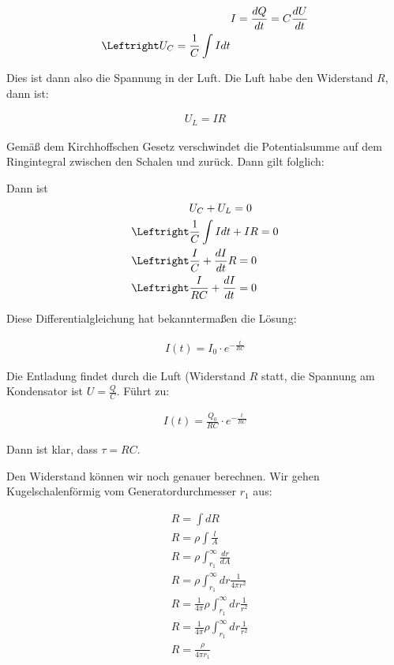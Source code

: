 \documentclass[a4paper,german,12pt,smallheadings]{scrartcl}
\begin{document}
\begin{align*}
  &I = \frac{dQ}{dt} = C \frac{dU}{dt} \\
  \Leftright U_C = \frac{1}{C} \int I dt
\end{align*}

Dies ist dann also die Spannung in der Luft. Die Luft habe den Widerstand $R$, dann ist:

\begin{align*}
  U_L = IR
\end{align*}

Gemäß dem Kirchhoffschen Gesetz verschwindet die Potentialsumme auf dem
Ringintegral zwischen den Schalen und zurück. Dann gilt folglich:

Dann ist
\begin{align*}
  &U_C + U_L = 0 \\
  \Leftright &\frac{1}{C} \int I dt + IR = 0 \\
  \Leftright &\frac{I}{C} + \frac{dI}{dt} R = 0 \\
  \Leftright &\frac{I}{RC} + \frac{dI}{dt} = 0 \\
\end{align*}

Diese Differentialgleichung hat bekanntermaßen die Lösung:

\begin{align*}
  I(t) = I_0 \cdot e^{-\frac{t}{RC}}
\end{align*}

Die Entladung findet durch die Luft (Widerstand $R$ statt, die Spannung am
Kondensator ist $U = \frac{Q}{C}$. Führt zu:

\begin{align*}
  I(t) = \frac{Q_0}{RC} \cdot e^{-\frac{t}{RC}}
\end{align*}

Dann ist klar, dass $\tau = RC$.

Den Widerstand können wir noch genauer berechnen. Wir gehen Kugelschalenförmig vom Generatordurchmesser $r_1$ aus:

\begin{align*}
  &R = \int dR \\
  &R = \rho \int \frac{l}{A} \\
  &R = \rho \int_{r_1}^\infty \frac{dr}{dA} \\
  &R = \rho \int_{r_1}^\infty dr \frac{1}{4 \pi r^2} \\
  &R = \frac{1}{4 \pi}\rho \int_{r_1}^\infty dr \frac{1}{r^2} \\
  &R = \frac{1}{4 \pi}\rho \int_{r_1}^\infty dr \frac{1}{r^2} \\
  &R = \frac{\rho}{4 \pi r_1}
\end{align*}
\end{document}
